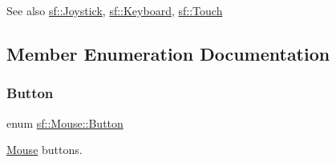 \begin{DoxySeeAlso}{See also}
\mbox{\hyperlink{classsf_1_1_joystick}{sf\+::\+Joystick}}, \mbox{\hyperlink{classsf_1_1_keyboard}{sf\+::\+Keyboard}}, \mbox{\hyperlink{classsf_1_1_touch}{sf\+::\+Touch}} \begin{DoxyVerb}\end{DoxyVerb}
 
\end{DoxySeeAlso}


\subsection{Member Enumeration Documentation}
\mbox{\label{classsf_1_1_mouse_a4fb128be433f9aafe66bc0c605daaa90}} 
\subsubsection{\texorpdfstring{Button}{Button}}
{\footnotesize\ttfamily enum \mbox{\hyperlink{classsf_1_1_mouse_a4fb128be433f9aafe66bc0c605daaa90}{sf\+::\+Mouse\+::\+Button}}}



\mbox{\hyperlink{classsf_1_1_mouse}{Mouse}} buttons. 

